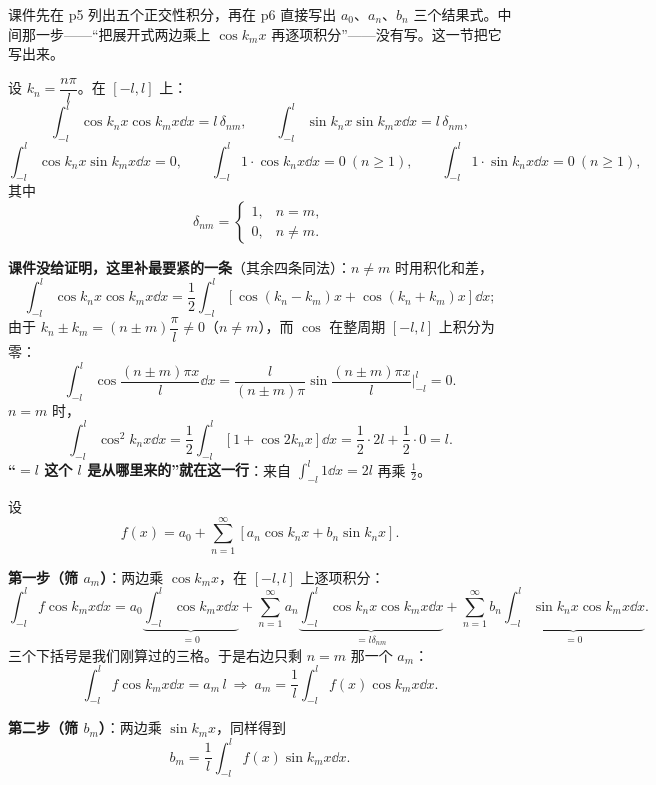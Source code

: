 \documentclass[11pt]{ctexart}
\begin{document}


课件先在 p5 列出五个正交性积分，再在 p6 直接写出 $a_0$、$a_n$、$b_n$ 三个结果式。中间那一步——“把展开式两边乘上 $\cos k_mx$ 再逐项积分”——没有写。这一节把它写出来。


设 $k_n=\dfrac{n\pi}{l}$。在 $[-l,l]$ 上：
\[
\int_{-l}^{l}\cos k_nx\cos k_mx\dd x=l\,\delta_{nm},\qquad
\int_{-l}^{l}\sin k_nx\sin k_mx\dd x=l\,\delta_{nm},
\]
\[
\int_{-l}^{l}\cos k_nx\sin k_mx\dd x=0,\qquad
\int_{-l}^{l}1\cdot\cos k_nx\dd x=0\ (n\ge1),\qquad
\int_{-l}^{l}1\cdot\sin k_nx\dd x=0\ (n\ge1),
\]
其中
\[
\delta_{nm}=\begin{cases}1, & n=m,\\ 0, & n\ne m .\end{cases}
\]

\textbf{课件没给证明，这里补最要紧的一条}（其余四条同法）：$n\ne m$ 时用积化和差，
\[
\int_{-l}^{l}\cos k_nx\cos k_mx\dd x
=\frac{1}{2}\int_{-l}^{l}\left[\cos(k_n-k_m)x+\cos(k_n+k_m)x\right]\dd x ;
\]
由于 $k_n\pm k_m=(n\pm m)\dfrac{\pi}{l}\ne0$（$n\ne m$），而 $\cos$ 在整周期 $[-l,l]$ 上积分为零：
\[
\int_{-l}^{l}\cos\frac{(n\pm m)\pi x}{l}\dd x=\frac{l}{(n\pm m)\pi}\sin\frac{(n\pm m)\pi x}{l}\Big|_{-l}^{l}=0 .
\]
$n=m$ 时，
\[
\int_{-l}^{l}\cos^2k_nx\dd x=\frac{1}{2}\int_{-l}^{l}\left[1+\cos2k_nx\right]\dd x=\frac{1}{2}\cdot 2l+\frac{1}{2}\cdot 0=l .
\]
\textbf{“$=l$ 这个 $l$ 是从哪里来的”就在这一行}：来自 $\int_{-l}^{l}1\dd x=2l$ 再乘 $\frac12$。


设
\[ f(x)=a_0+\sum_{n=1}^{\infty}\left[a_n\cos k_nx+b_n\sin k_nx\right] .\]

\textbf{第一步（筛 $a_m$）}：两边乘 $\cos k_mx$，在 $[-l,l]$ 上逐项积分：
\[
\int_{-l}^{l}f\cos k_mx\dd x
=a_0\underbrace{\int_{-l}^{l}\cos k_mx\dd x}_{=0}
+\sum_{n=1}^{\infty}a_n\underbrace{\int_{-l}^{l}\cos k_nx\cos k_mx\dd x}_{=l\delta_{nm}}
+\sum_{n=1}^{\infty}b_n\underbrace{\int_{-l}^{l}\sin k_nx\cos k_mx\dd x}_{=0} .
\]
三个下括号是我们刚算过的三格。于是右边只剩 $n=m$ 那一个 $a_m$：
\[ \int_{-l}^{l}f\cos k_mx\dd x=a_m\,l\ \Longrightarrow\ a_m=\frac{1}{l}\int_{-l}^{l}f(x)\cos k_mx\dd x .\]

\textbf{第二步（筛 $b_m$）}：两边乘 $\sin k_mx$，同样得到
\[ b_m=\frac{1}{l}\int_{-l}^{l}f(x)\sin k_mx\dd x .\]
\end{document}
